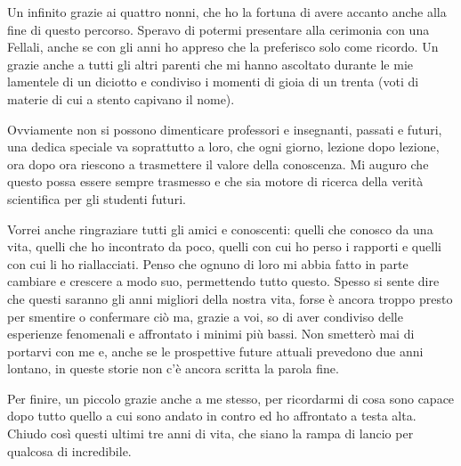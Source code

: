 \documentclass[12pt,a4paper,twoside]{book}
\begin{document}
Un infinito grazie ai quattro nonni, che ho la fortuna di avere accanto anche alla fine di questo percorso. Speravo di potermi presentare alla cerimonia con una Fellali, anche se con gli anni ho appreso che la preferisco solo come ricordo. Un grazie anche a tutti gli altri parenti che mi hanno ascoltato durante le mie lamentele di un diciotto e condiviso i momenti di gioia di un trenta (voti di materie di cui a stento capivano il nome).

Ovviamente non si possono dimenticare professori e insegnanti, passati e futuri, una dedica speciale va soprattutto a loro, che ogni giorno, lezione dopo lezione, ora dopo ora riescono a trasmettere il valore della conoscenza. Mi auguro che questo possa essere sempre trasmesso e che sia motore di ricerca della verità scientifica per gli studenti futuri.


Vorrei anche ringraziare tutti gli amici e conoscenti: quelli che conosco da una vita, quelli che ho incontrato da poco, quelli con cui ho perso i rapporti e quelli con cui li ho riallacciati. Penso che ognuno di loro mi abbia fatto in parte cambiare e crescere a modo suo, permettendo tutto questo. Spesso si sente dire che questi saranno gli anni migliori della nostra vita, forse è ancora troppo presto per smentire o confermare ciò ma, grazie a voi, so di aver condiviso delle esperienze fenomenali e affrontato i minimi più bassi. Non smetterò mai di portarvi con me e, anche se le prospettive future attuali prevedono due anni lontano, in queste storie non c'è ancora scritta la parola fine.

Per finire, un piccolo grazie anche a me stesso, per ricordarmi di cosa sono capace dopo tutto quello a cui sono andato in contro ed ho affrontato a testa alta. Chiudo così questi ultimi tre anni di vita, che siano la rampa di lancio per qualcosa di incredibile.
\end{document}
